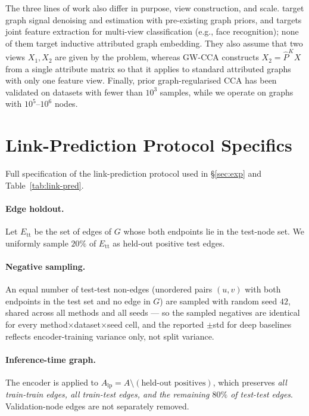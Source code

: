 \documentclass{article}
\begin{document}
The three lines of work also differ in purpose, view construction, and
scale. \citet{chen2018canonical,chen2018canonical2} target graph signal
denoising and estimation with pre-existing graph priors, and
\citet{yuan2014graph} targets joint feature extraction for multi-view
classification (e.g., face recognition); none of them target inductive
attributed graph embedding. They also assume that two views $X_1, X_2$
are given by the problem, whereas GW-CCA constructs $X_2 = \widehat{P}^K
X$ from a single attribute matrix so that it applies to standard
attributed graphs with only one feature view. Finally, prior
graph-regularised CCA has been validated on datasets with fewer than
$10^3$ samples, while we operate on graphs with $10^5$--$10^6$ nodes.

\section{Link-Prediction Protocol Specifics}
\label{app:lp-protocol}

Full specification of the link-prediction protocol used in \S\ref{sec:exp}
and Table~\ref{tab:link-pred}.

\paragraph{Edge holdout.}
Let $E_{\text{tt}}$ be the set of edges of $G$ whose both endpoints lie in
the test-node set. We uniformly sample $20\%$ of $E_{\text{tt}}$ as
held-out positive test edges.

\paragraph{Negative sampling.}
An equal number of test-test non-edges (unordered pairs $(u, v)$ with both
endpoints in the test set and no edge in $G$) are sampled with random
seed $42$, shared across all methods and all seeds --- so the sampled
negatives are identical for every method$\times$dataset$\times$seed cell,
and the reported $\pm$std for deep baselines reflects encoder-training
variance only, not split variance.

\paragraph{Inference-time graph.}
The encoder is applied to
$A_{\text{lp}} = A \setminus (\text{held-out positives})$, which
preserves \emph{all train-train edges, all train-test edges, and the
remaining $80\%$ of test-test edges}. Validation-node edges are not
separately removed.
\end{document}
